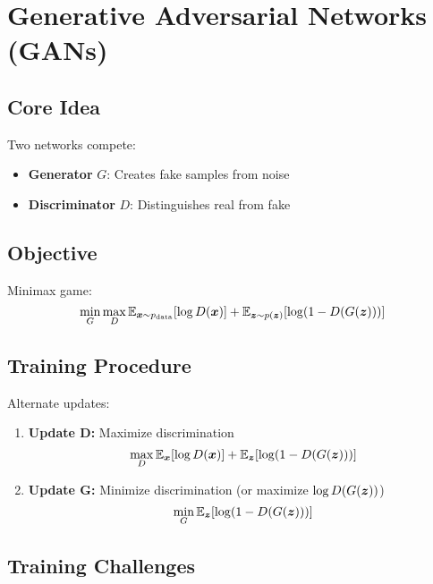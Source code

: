 
\section{Generative Adversarial Networks (GANs)}
\label{sec:gans}

\subsection{Core Idea}

Two networks compete:
\begin{itemize}
    \item \textbf{Generator} $G$: Creates fake samples from noise
    \item \textbf{Discriminator} $D$: Distinguishes real from fake
\end{itemize}

\subsection{Objective}

Minimax game:
\begin{equation}
\min_G \max_D \mathbb{E}_{\boldsymbol{x} \sim p_{\text{data}}}[\log D(\boldsymbol{x})] + \mathbb{E}_{\boldsymbol{z} \sim p(\boldsymbol{z})}[\log(1 - D(G(\boldsymbol{z})))]
\end{equation}

\subsection{Training Procedure}

Alternate updates:
\begin{enumerate}
    \item \textbf{Update D:} Maximize discrimination
    \begin{equation}
    \max_D \mathbb{E}_{\boldsymbol{x}}[\log D(\boldsymbol{x})] + \mathbb{E}_{\boldsymbol{z}}[\log(1 - D(G(\boldsymbol{z})))]
    \end{equation}
    
    \item \textbf{Update G:} Minimize discrimination (or maximize $\log D(G(\boldsymbol{z}))$)
    \begin{equation}
    \min_G \mathbb{E}_{\boldsymbol{z}}[\log(1 - D(G(\boldsymbol{z})))]
    \end{equation}
\end{enumerate}

\subsection{Training Challenges}

